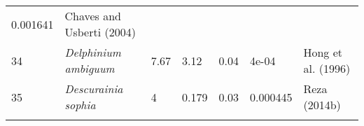 \documentclass[]{article}
\begin{document}
\begin{longtable}[]{@{}lllllll@{}}
\begin{minipage}[t]{0.08\columnwidth}
0.001641\strut
\end{minipage} & \begin{minipage}[t]{0.23\columnwidth}\raggedright
Chaves and Usberti (2004)\strut
\end{minipage}\tabularnewline
\begin{minipage}[t]{0.05\columnwidth}\raggedright
34\strut
\end{minipage} & \begin{minipage}[t]{0.23\columnwidth}\raggedright
\emph{Delphinium ambiguum}\strut
\end{minipage} & \begin{minipage}[t]{0.05\columnwidth}\raggedright
7.67\strut
\end{minipage} & \begin{minipage}[t]{0.08\columnwidth}\raggedright
3.12\strut
\end{minipage} & \begin{minipage}[t]{0.08\columnwidth}\raggedright
0.04\strut
\end{minipage} & \begin{minipage}[t]{0.08\columnwidth}\raggedright
4e-04\strut
\end{minipage} & \begin{minipage}[t]{0.23\columnwidth}\raggedright
Hong et al. (1996)\strut
\end{minipage}\tabularnewline
\begin{minipage}[t]{0.05\columnwidth}\raggedright
35\strut
\end{minipage} & \begin{minipage}[t]{0.23\columnwidth}\raggedright
\emph{Descurainia sophia}\strut
\end{minipage} & \begin{minipage}[t]{0.05\columnwidth}\raggedright
4\strut
\end{minipage} & \begin{minipage}[t]{0.08\columnwidth}\raggedright
0.179\strut
\end{minipage} & \begin{minipage}[t]{0.08\columnwidth}\raggedright
0.03\strut
\end{minipage} & \begin{minipage}[t]{0.08\columnwidth}\raggedright
0.000445\strut
\end{minipage} & \begin{minipage}[t]{0.23\columnwidth}\raggedright
Reza (2014b)\strut
\end{minipage}\tabularnewline
\begin{minipage}[t]{0.05\columnwidth}\raggedright

\end{minipage}
\end{longtable}
\end{document}
